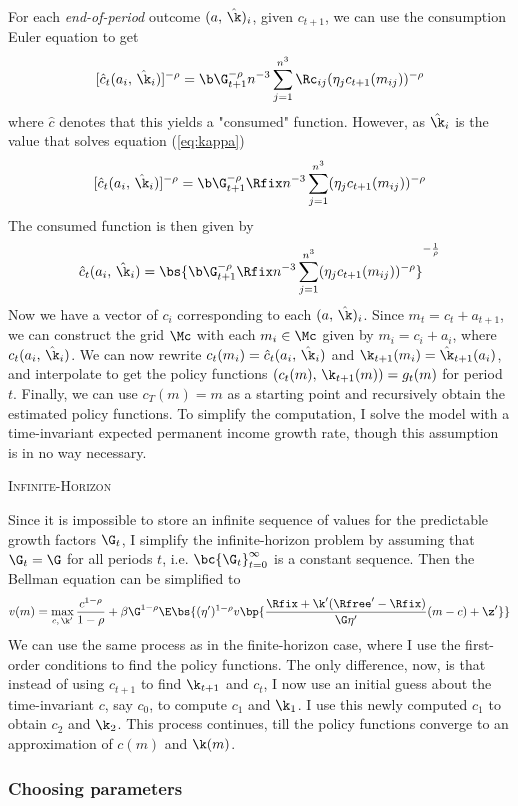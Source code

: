 For each \textit{end-of-period} outcome $(a,\,\hat{\k})_i$, given $c_{t+1}$, we can use the consumption Euler equation to get
\[
[\hat{c}_t(a_i,\,\hat{\k}_i)]^{-\rho} = \b\G_{t+1}^{-\rho} n^{-3}\sum_{j=1}^{n^3}\Rc_{ij}(\eta_{j}c_{t+1}(m_{ij}))^{-\rho}
\]
where $\hat{c}$ denotes that this yields a "consumed" function. However, as $\hat{\k}_{i}$ is the value that solves equation (\ref{eq:kappa})
\[
[\hat{c}_{t}(a_i,\,\hat{\k}_i)]^{-\rho} = \b\G_{t+1}^{-\rho}\Rfix n^{-3}\sum_{j=1}^{n^3}(\eta_{j}c_{t+1}(m_{ij}))^{-\rho}
\]
The consumed function is then given by
\[
\hat{c}_{t}(a_i,\,\hat{\k}_i) = \bs{\b\G_{t+1}^{-\rho}\Rfix n^{-3}\sum_{j=1}^{n^3}(\eta_{j}c_{t+1}(m_{ij}))^{-\rho}}^{-\frac{1}{\rho}}
\]
Now we have a vector of $c_i$ corresponding to each $(a,\,\hat{\k})_i$. Since $m_{t} = c_{t} + a_{t+1}$, we can construct the grid $\Mc$ with each $m_i \in \Mc$ given by $m_i = c_i + a_i$, where $c_{t}(a_i,\,\hat{\k}_i)$. We can now rewrite $c_t(m_i) = \hat{c}_t(a_i,\,\hat{\k}_i)$ and $\k_{t+1}(m_i) = \hat{\k}_{t+1}(a_i)$, and interpolate to get the policy functions $(c_{t}(m),\,\k_{t+1}(m)) = g_{t}(m)$ for period $t$. Finally, we can use $c_{T}(m) = m$ as a starting point and recursively obtain the estimated policy functions. To simplify the computation, I solve the model with a time-invariant expected permanent income growth rate, though this assumption is in no way necessary.

\textsc{Infinite-Horizon}

Since it is impossible to store an infinite sequence of values for the predictable growth factors $\G_{t}$, I simplify the infinite-horizon problem by assuming that $\G_{t} = \G$ for all periods $t$, i.e. $\bc{\G_{t}}_{t=0}^{\infty}$ is a constant sequence. Then the Bellman equation can be simplified to
\[
v(m) = \max_{c,\,\k'}\frac{c^{1-\rho}}{1-\rho} + \beta\G^{1-\rho} \E\bs{(\eta')^{1-\rho}v\bp{\frac{\Rfix + \k'(\Rfree' - \Rfix)}{\G\eta'}(m - c) + \z'}}
\]
We can use the same process as in the finite-horizon case, where I use the first-order conditions to find the policy functions. The only difference, now, is that instead of using $c_{t+1}$ to find $\k_{t+1}$ and $c_{t}$, I now use an initial guess about the time-invariant $c$, say $c_{0}$, to compute $c_{1}$ and $\k_1$. I use this newly computed $c_1$ to obtain $c_2$ and $\k_2$. This process continues, till the policy functions converge to an approximation of $c(m)$ and $\k(m)$.

\subsubsection{Choosing parameters}

